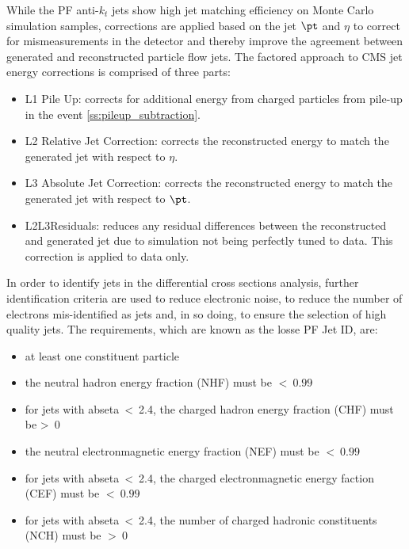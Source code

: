 While the PF anti-$k_{t}$ jets show high jet matching efficiency on Monte Carlo simulation samples,
corrections are applied based on the jet $\pt$ and $\eta$ to correct for mismeasurements in the
detector and thereby improve the agreement between generated and reconstructed particle flow jets. The
factored approach to CMS jet energy corrections is comprised of three parts:

\begin{itemize}
  \item {L1 Pile Up: corrects for additional energy from charged particles from pile-up in the event
  \ref{ss:pileup_subtraction}.}
  \item {L2 Relative Jet Correction: corrects the reconstructed energy to match the generated jet with respect
  to $\eta$.} %
  \item {L3 Absolute Jet Correction: corrects the reconstructed energy to match the generated jet with respect
  to $\pt$.} %
  \item {L2L3Residuals: reduces any residual differences between the reconstructed and generated
  jet due to simulation not being perfectly tuned to data. This correction is applied to data only.}
\end{itemize}

In order to identify jets in the differential cross sections analysis, further identification criteria are
used to reduce electronic noise, to reduce the number of electrons mis-identified as jets and, in so doing, to
ensure the selection of high quality jets. The requirements, which are known as the losse PF Jet ID, are:

\begin{itemize}
  \item at least one constituent particle
  \item the neutral hadron energy fraction (NHF) must be $<~0.99$
  \item for jets with abseta~<~2.4, the charged hadron energy fraction (CHF) must be >~0
  \item the neutral electronmagnetic energy fraction (NEF) must be $<~0.99$
  \item for jets with abseta~<~2.4, the charged electronmagnetic energy faction (CEF) must be $<~0.99$
  \item for jets with abseta~<~2.4, the number of charged hadronic constituents (NCH) must be $>~0$
\end{itemize}

